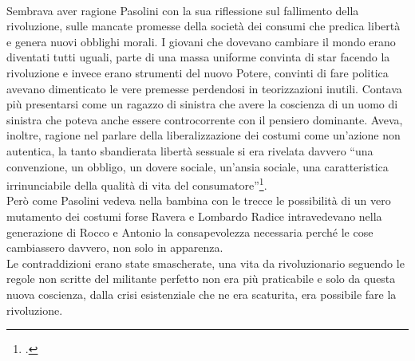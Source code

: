 \paragraph{}Sembrava aver ragione Pasolini con la sua riflessione sul fallimento della rivoluzione, sulle mancate promesse della società dei consumi che predica libertà e genera nuovi obblighi morali.
I giovani che dovevano cambiare il mondo erano diventati tutti uguali, parte di una massa uniforme convinta di star facendo la rivoluzione e invece erano strumenti del nuovo Potere, convinti di fare politica avevano dimenticato le vere premesse perdendosi in teorizzazioni inutili.
Contava più presentarsi come un ragazzo di sinistra che avere la coscienza di un uomo di sinistra che poteva anche essere controcorrente con il pensiero dominante.
Aveva, inoltre, ragione nel parlare della liberalizzazione dei costumi come un'azione non autentica, la tanto sbandierata libertà sessuale si era rivelata davvero \enquote{una convenzione, un obbligo, un dovere sociale, un’ansia sociale, una caratteristica irrinunciabile della qualità di vita del consumatore}\footcite{Scritti9}.
\\Però come Pasolini vedeva nella bambina con le trecce le possibilità di un vero mutamento dei costumi forse Ravera e Lombardo Radice intravedevano nella generazione di Rocco e Antonio la consapevolezza necessaria perché le cose cambiassero davvero, non solo in apparenza.
\\Le contraddizioni erano state smascherate, una vita da rivoluzionario seguendo le regole non scritte del militante perfetto non era più praticabile e solo da questa nuova coscienza, dalla crisi esistenziale che ne era scaturita, era possibile fare la rivoluzione.


